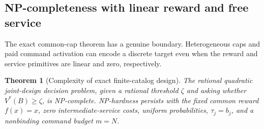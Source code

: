 \documentclass[11pt,letterpaper]{article}
\newtheorem{theorem}{Theorem}[section]
\theoremstyle{definition}\newtheorem{remark}[theorem]{Remark}
\begin{document}
\subsection{NP-completeness with linear reward and free service}\label{sec:hard54}
The exact common-cap theorem has a genuine boundary. Heterogeneous caps and paid command activation can encode a discrete target even when the reward and service primitives are linear and zero, respectively.
\begin{theorem}[Complexity of exact finite-catalog design]\label{thm:hard54}
The rational quadratic joint-design decision problem, given a rational threshold $\zeta$ and asking whether $V^*(B)\geq\zeta$, is NP-complete. NP-hardness persists with the fixed common reward $f(x)=x$, zero intermediate-service costs, uniform probabilities, $\tau_j=b_j$, and a nonbinding command budget $m=N$.
\end{theorem}
\end{document}
